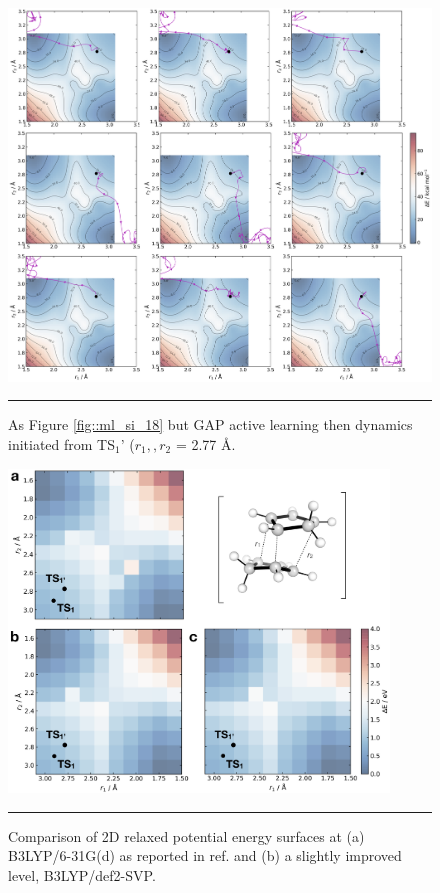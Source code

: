\documentclass[../../main.tex]{subfiles}
\begin{document}
\begin{figure}[h!]
	\vspace{0.4cm}
	\centering
	\includegraphics[width=\textwidth]{6/gap/figs_si/fig20}
	\vspace{0.2cm}
	\hrule
	\caption{As Figure \ref{fig::ml_si_18} but GAP active learning then dynamics initiated from TS${}_1’$ ($r_1,, r_2$ = 2.77 \AA.}
	\label{fig::ml_si_20}
\end{figure}



\begin{figure}[h!]
	\vspace{0.4cm}
	\centering
	\includegraphics[width=0.9\textwidth]{6/gap/figs_si/fig21}
	\vspace{0.2cm}
	\hrule
	\caption{Comparison of 2D relaxed potential energy surfaces at (a) B3LYP/6-31G(d) as reported in ref. \cite{Caramella2002} and (b) a slightly improved level, B3LYP/def2-SVP.}
	\label{fig::ml_si_21}
\end{figure}
\end{document}
